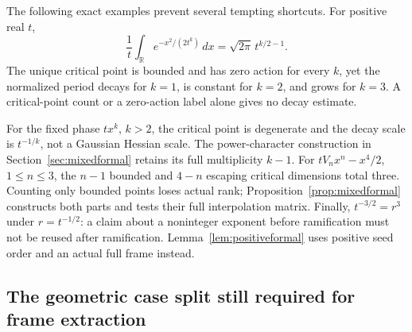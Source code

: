 The following exact examples prevent several tempting shortcuts.
For positive real $t$,
\[
 \frac1t\int_{\mathbb R}e^{-x^2/(2t^k)}\,dx
   =\sqrt{2\pi}\,t^{k/2-1}.
\]
The unique critical point is bounded and has zero action for every
$k$, yet the normalized period decays for $k=1$, is constant for
$k=2$, and grows for $k=3$. A critical-point count or a zero-action
label alone gives no decay estimate.

For the fixed phase $tx^k$, $k>2$, the critical point is degenerate
and the decay scale is $t^{-1/k}$, not a Gaussian Hessian scale.
The power-character construction in Section~\ref{sec:mixedformal}
retains its full multiplicity $k-1$.
For $tV_nx^n-x^4/2$, $1\leq n\leq3$, the $n-1$ bounded and
$4-n$ escaping critical dimensions total three. Counting only
bounded points loses actual rank; Proposition~\ref{prop:mixedformal}
constructs both parts and tests their full interpolation matrix.
Finally, $t^{-3/2}=r^3$ under $r=t^{-1/2}$: a claim about a
noninteger exponent before ramification must not be reused after
ramification. Lemma~\ref{lem:positiveformal} uses positive seed order
and an actual full frame instead.

\subsection{The geometric case split still required for frame extraction}

